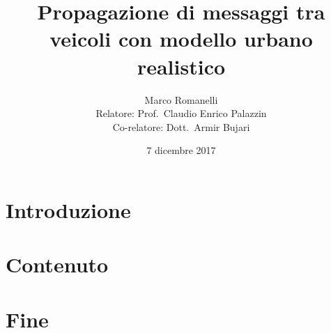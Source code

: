 \documentclass[12pt]{beamer}
\author[Romanelli,Marco]{Marco Romanelli\\[.5\baselineskip]
\scriptsize Relatore: Prof.\ Claudio Enrico Palazzin\\
\scriptsize Co-relatore: Dott.\ Armir Bujari}
\title{Propagazione di messaggi tra veicoli con modello urbano realistico}
\institute{Università di Padova}
\date{7 dicembre 2017}
\begin{document}
\section{Introduzione}\label{sec:intro}
\begin{frame}[t,plain]
	\titlepage
\end{frame}


	\setcounter{framenumber}{0} %
	\section{Contenuto}\label{sec:contenuto}
	

	\section{Fine}\label{sec:fine}
	

\end{document}
